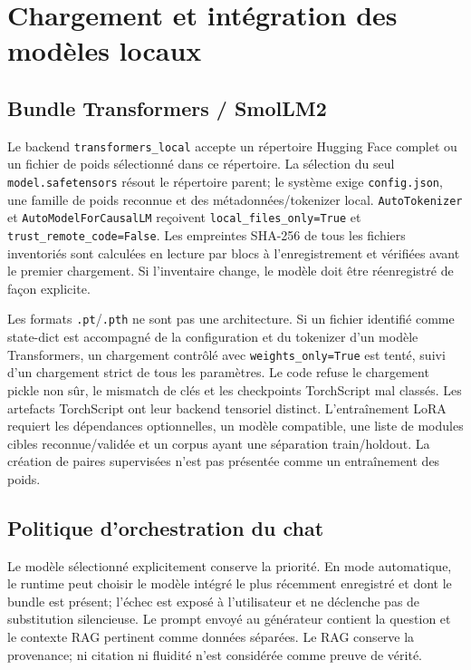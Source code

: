 \documentclass[11pt,a4paper]{article}
\begin{document}
\section{Chargement et intégration des modèles locaux}
\subsection{Bundle Transformers / SmolLM2}
Le backend \texttt{transformers\_local} accepte un répertoire Hugging Face complet ou un fichier de poids sélectionné dans ce répertoire. La sélection du seul \texttt{model.safetensors} résout le répertoire parent; le système exige \texttt{config.json}, une famille de poids reconnue et des métadonnées/tokenizer local. \texttt{AutoTokenizer} et \texttt{AutoModelForCausalLM} reçoivent \texttt{local\_files\_only=True} et \texttt{trust\_remote\_code=False}. Les empreintes SHA-256 de tous les fichiers inventoriés sont calculées en lecture par blocs à l'enregistrement et vérifiées avant le premier chargement. Si l'inventaire change, le modèle doit être réenregistré de façon explicite.

Les formats \texttt{.pt}/\texttt{.pth} ne sont pas une architecture. Si un fichier identifié comme state-dict est accompagné de la configuration et du tokenizer d'un modèle Transformers, un chargement contrôlé avec \texttt{weights\_only=True} est tenté, suivi d'un chargement strict de tous les paramètres. Le code refuse le chargement pickle non sûr, le mismatch de clés et les checkpoints TorchScript mal classés. Les artefacts TorchScript ont leur backend tensoriel distinct. L'entraînement LoRA requiert les dépendances optionnelles, un modèle compatible, une liste de modules cibles reconnue/validée et un corpus ayant une séparation train/holdout. La création de paires supervisées n'est pas présentée comme un entraînement des poids.

\subsection{Politique d'orchestration du chat}
Le modèle sélectionné explicitement conserve la priorité. En mode automatique, le runtime peut choisir le modèle intégré le plus récemment enregistré et dont le bundle est présent; l'échec est exposé à l'utilisateur et ne déclenche pas de substitution silencieuse. Le prompt envoyé au générateur contient la question et le contexte RAG pertinent comme données séparées. Le RAG conserve la provenance; ni citation ni fluidité n'est considérée comme preuve de vérité.
\end{document}
